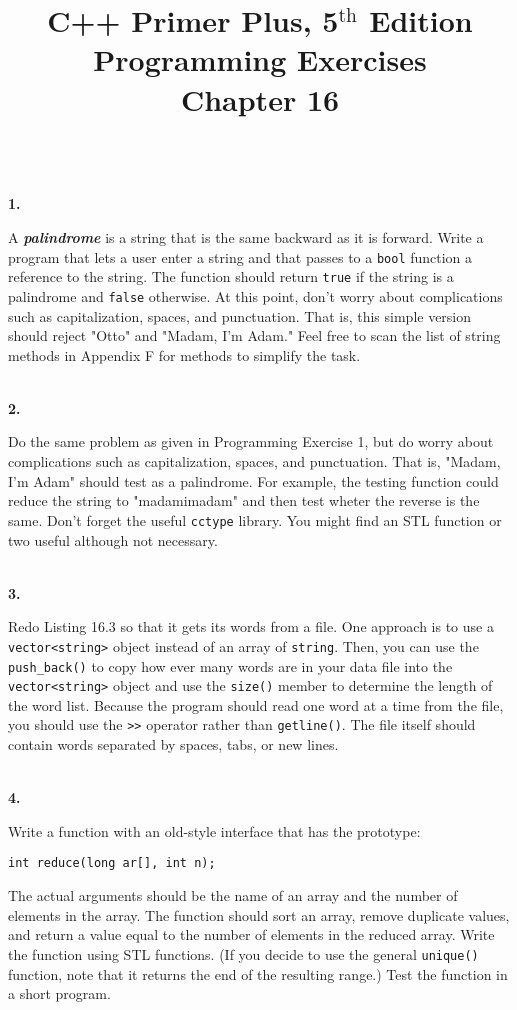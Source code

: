 \documentclass[10 pt]{amsart}
\newlength{\cwidth}
\newenvironment{cpart}[2][\cwidth]
	{%
		\\ %
		\textbf{#2. }%
		\begin{minipage}[t]{#1}%
		\setlength{\parindent}{0pt}%
		\setlength{\parskip}{2ex}%
	}
	{%
		\end{minipage}%
	}
\newcommand{\ttt}[1]{\texttt{#1}}
\newcommand{\ChapNum}{16}
\begin{document}
	\title
	[Chapter \ChapNum]
	{C++ Primer Plus, 5$^\text{th}$ Edition \\
	Programming Exercises \\
	Chapter \ChapNum}

	\maketitle

	\begin{cpart}{1}
		A {\bfseries \textsl{palindrome}} is a string that is the
		same backward as it is forward.
		Write a program that lets a user enter a string and that 
		passes to a \ttt{bool} function a reference to the string.
		The function should return \ttt{true} if the string is a
		palindrome and \ttt{false} otherwise.
		At this point, don't worry about complications such as
		capitalization, spaces, and punctuation.
		That is, this simple version should reject "Otto" and 
		"Madam, I'm Adam."
		Feel free to scan the list of string methods in Appendix F
		for methods to simplify the task.
	\end{cpart}

	\begin{cpart}{2}
		Do the same problem as given in Programming Exercise 1, but 
		do worry about complications such as capitalization, spaces,
		and punctuation. 
		That is, "Madam, I'm Adam" should test as a palindrome.
		For example, the testing function could reduce the string to 
		"madamimadam" and then test wheter the reverse is the same.
		Don't forget the useful \ttt{cctype} library.
		You might find an STL function or two useful although not 
		necessary.
	\end{cpart}

	\begin{cpart}{3}
		Redo Listing 16.3 so that it gets its words from a file.
		One approach is to use a \ttt{vector<string>} object instead
		of an array of \ttt{string}.
		Then, you can use the \ttt{push\_back()} to copy
		how ever many words are in your data file into the
		\ttt{vector<string>} object and use the \ttt{size()}
		member to determine the length of the word list.
		Because the program should read one word at a time from the
		file, you should use the \ttt{>>} operator rather than
		\ttt{getline()}.
		The file itself should contain words separated by spaces,
		tabs, or new lines.
	\end{cpart}

	\begin{cpart}{4}
		Write a function with an old-style interface that has
		the prototype:

		\ttt{int reduce(long ar[], int n);} 

		The actual arguments should be the name of an array and the 
		number of elements in the array.
		The function should sort an array, remove duplicate values,
		and return a value equal to the number of elements in the
		reduced array.
		Write the function using STL functions.
		(If you decide to use the general \ttt{unique()} function, 
		note that it returns the end of the resulting range.)
		Test the function in a short program.
	\end{cpart}
\end{document}
